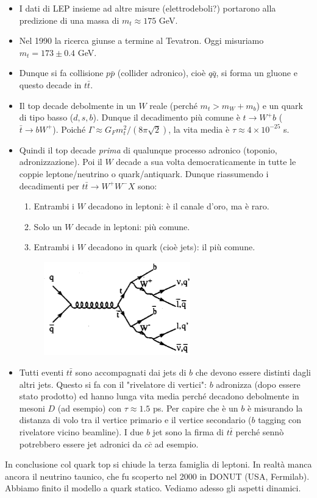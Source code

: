 \begin{itemize}
    \item I dati di LEP insieme ad altre misure (elettrodeboli?) portarono alla predizione di una massa di $m_t\approx 175$ GeV.
    \item Nel 1990 la ricerca giunse a termine al Tevatron. Oggi misuriamo $m_t=173\pm0.4$ GeV.
    \item Dunque si fa collisione $p\bar p$ (collider adronico), cioè $q\bar q$, si forma un gluone e questo decade in $t\bar t$. 
    \item Il top decade debolmente in un $W$ reale (perché $m_t>m_W+m_b$) e un quark di tipo basso ($d,s,b$). Dunque il decadimento più comune è $t\to W^+b$ ($\bar t\to bW^+$). Poiché $\Gamma\approx G_Fm_t^2/(8\pi\sqrt2)$, la vita media è $\tau\approx4\times10^{-25}$ s.
    \item Quindi il top decade \textit{prima} di qualunque processo adronico (toponio, adronizzazione). Poi il $W$ decade a sua volta democraticamente in tutte le coppie leptone/neutrino o quark/antiquark. Dunque riassumendo i decadimenti per $t\bar t\to W^+W^-X$ sono:
    \begin{enumerate}
        \item Entrambi i $W$ decadono in leptoni: è il canale d'oro, ma è raro.
        \item Solo un $W$ decade in leptoni: più comune.
        \item Entrambi i $W$ decadono in quark (cioè jets): il più comune.
    \end{enumerate}
    \begin{figure}[H]
        \centering
        \includegraphics[width=0.6\textwidth]{immagini/fig_t_decay.png}
    \end{figure}
    \item Tutti eventi $t\bar t$ sono accompagnati dai jets di $b$ che devono essere distinti dagli altri jets. Questo si fa con il "rivelatore di vertici": $b$ adronizza (dopo essere stato prodotto) ed hanno lunga vita media perché decadono debolmente in mesoni $D$ (ad esempio) con $\tau\approx1.5$ ps. Per capire che è un $b$ è misurando la distanza di volo tra il vertice primario e il vertice secondario ($b$ tagging con rivelatore vicino beamline). I due $b$ jet sono la firma di $t\bar t$ perché sennò potrebbero essere jet adronici da $c\bar c$ ad esempio.
\end{itemize}
In conclusione col quark top si chiude la terza famiglia di leptoni. In realtà manca ancora il neutrino taunico, che fu scoperto nel 2000 in DONUT (USA, Fermilab). Abbiamo finito il modello a quark statico. Vediamo adesso gli aspetti dinamici.